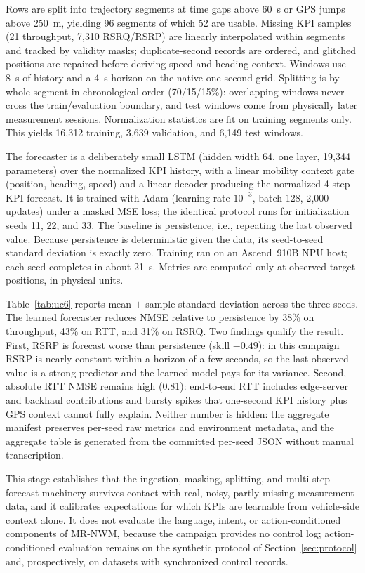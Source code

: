 \documentclass[10pt,twocolumn]{article}
\begin{document}
Rows are split into trajectory segments at time gaps above 60~s or GPS jumps
above 250~m, yielding 96 segments of which 52 are usable. Missing KPI samples
(21 throughput, 7{,}310 RSRQ/RSRP) are linearly interpolated within segments
and tracked by validity masks; duplicate-second records are ordered, and
glitched positions are repaired before deriving speed and heading context.
Windows use 8~s of history and a 4~s horizon on the native one-second grid.
Splitting is by whole segment in chronological order (70/15/15\%): overlapping
windows never cross the train/evaluation boundary, and test windows come from
physically later measurement sessions. Normalization statistics are fit on
training segments only. This yields 16{,}312 training, 3{,}639 validation, and
6{,}149 test windows.

The forecaster is a deliberately small LSTM (hidden width 64, one layer,
19{,}344 parameters) over the normalized KPI history, with a linear mobility
context gate (position, heading, speed) and a linear decoder producing the
normalized 4-step KPI forecast. It is trained with Adam (learning rate
$10^{-3}$, batch 128, 2{,}000 updates) under a masked MSE loss; the identical
protocol runs for initialization seeds 11, 22, and 33. The baseline is
persistence, i.e., repeating the last observed value. Because persistence is
deterministic given the data, its seed-to-seed standard deviation is exactly
zero. Training ran on an Ascend~910B NPU host; each seed completes in about
21~s. Metrics are computed only at observed target positions, in physical
units.

Table~\ref{tab:uc6} reports mean $\pm$ sample standard deviation across the
three seeds. The learned forecaster reduces NMSE relative to persistence by
38\% on throughput, 43\% on RTT, and 31\% on RSRQ. Two findings qualify the
result. First, RSRP is forecast worse than persistence
(skill $-0.49$): in this campaign RSRP is nearly constant within a horizon of
a few seconds, so the last observed value is a strong predictor and the
learned model pays for its variance. Second, absolute RTT NMSE remains high
(0.81): end-to-end RTT includes edge-server and backhaul contributions and
bursty spikes that one-second KPI history plus GPS context cannot fully
explain. Neither number is hidden: the aggregate manifest preserves per-seed
raw metrics and environment metadata, and the aggregate table is generated
from the committed per-seed JSON without manual transcription.

This stage establishes that the ingestion, masking, splitting, and
multi-step-forecast machinery survives contact with real, noisy, partly
missing measurement data, and it calibrates expectations for which KPIs are
learnable from vehicle-side context alone. It does not evaluate the language,
intent, or action-conditioned components of MR-NWM, because the campaign
provides no control log; action-conditioned evaluation remains on the
synthetic protocol of Section~\ref{sec:protocol} and, prospectively, on
datasets with synchronized control records.
\end{document}
